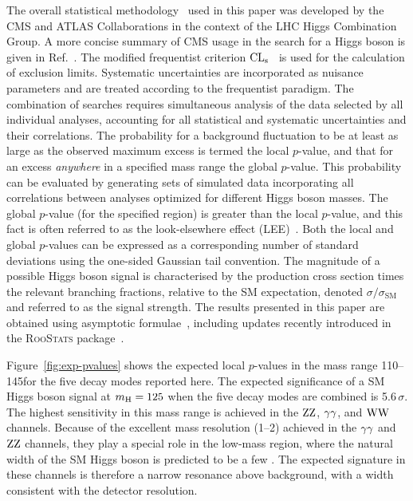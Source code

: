 \documentclass[11pt,twoside,a4paper,cmspaper,final]{cms-tdr}
\begin{document}
The overall statistical methodology~\cite{LHC-HCG-Report} used in this paper was developed
by the CMS and ATLAS Collaborations in the context of the LHC Higgs
Combination Group.
A more concise summary of CMS usage in
the search for a Higgs boson is given in Ref.~\cite{Chatrchyan:2012tx}.
The modified frequentist criterion $\mathrm{CL_s}$~\cite{Junk:1999kv,Read1}
is used for the calculation of exclusion limits.
Systematic uncertainties are incorporated as nuisance parameters and
are treated according to the frequentist paradigm.
The combination of searches
requires simultaneous analysis of the data selected by all individual analyses,
accounting for all statistical and systematic uncertainties and their
correlations. The probability for a background
fluctuation to be at least as large as the observed maximum excess is termed the local $p$-value, and that
for an excess
\textit{anywhere} in a specified mass
range the global $p$-value.
This probability can be evaluated
by generating sets of simulated data incorporating all correlations between analyses optimized for
different Higgs boson masses.
The global $p$-value (for the specified region)
is greater than the local $p$-value, and this fact is often referred to as
the look-elsewhere effect (LEE)~\cite{LEE}.
Both the local and global $p$-values can be expressed as
a corresponding number of standard deviations
using the one-sided Gaussian tail convention. The magnitude of a possible Higgs boson signal is characterised by the
production cross section times the relevant branching fractions, relative to
the SM expectation, denoted $\sigma/\sigma_\mathrm{SM}$ and referred to as the signal
strength.
The results presented in this paper are obtained using asymptotic formulae~\cite{Cowan:2010st},
including updates recently introduced in the \textsc{RooStats}
package~\cite{RooStats}.

Figure~\ref{fig:exp-pvalues}
shows the expected local $p$-values in the mass range 110--145\GeV for the five
decay modes reported here.
The expected significance of a SM Higgs boson signal at $m_{\mathrm{H}} = 125$\GeV
when the five decay modes are combined is 5.6\,$\sigma$.
The highest sensitivity in this mass range is
achieved in the $\mathrm{Z}\mathrm{Z}$, $\gamma\gamma$, and $\mathrm{W}\mathrm{W}$ channels.
Because of the excellent mass resolution (1--2\GeV) achieved in the $\gamma\gamma$ and
$\mathrm{Z}\mathrm{Z}$ channels,
they play a special role in the low-mass region,
where the natural width of the SM Higgs boson is predicted to be a few \!\MeV.
The expected signature in these channels is therefore
a narrow resonance above background, with a width consistent with the detector resolution.
\end{document}
